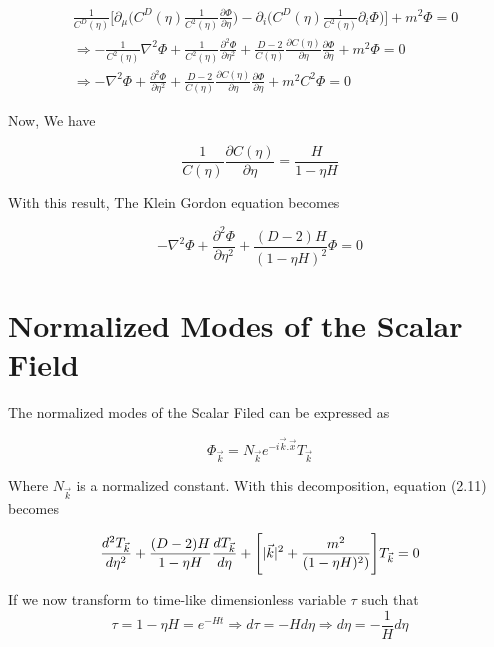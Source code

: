 \begin{equation}\label{eq8}
\begin{split}
& \frac{1}{C^D(\eta)}\bigg[\partial_\mu\bigg(C^D(\eta)\frac{1}{C^2(\eta)}\frac{\partial \Phi}{\partial \eta}\bigg) - \partial_i\bigg(C^D(\eta)\frac{1}{C^2(\eta)}\partial_i \Phi \bigg)\bigg] + m^2\Phi = 0 \\
&\Rightarrow - \frac{1}{C^2(\eta)}\nabla^2\Phi + \frac{1}{C^2(\eta)}\frac{\partial^2 \Phi}{\partial \eta^2} + \frac{D-2}{C(\eta)}\frac{\partial C(\eta)}{\partial \eta}\frac{\partial \Phi}{\partial \eta} + m^2\Phi = 0 \\
&\Rightarrow - \nabla ^2 \Phi + \frac{\partial^2\Phi}{\partial \eta^2}+\frac{D-2}{C(\eta)}\frac{\partial C(\eta)}{\partial \eta}\frac{\partial \Phi}{\partial \eta} + m^2C^2\Phi = 0
\end{split}
\end{equation}

Now, We have

\begin{equation}
\frac{1}{C(\eta)}\frac{\partial C(\eta)}{\partial \eta} = \frac{H}{1-\eta H}
\end{equation}

With this result, The Klein Gordon equation becomes

\begin{equation}
-\nabla^2\Phi + \frac{\partial^2 \Phi}{\partial\eta^2}+\frac{(D-2)H}{(1-\eta H)^2}\Phi=0
\end{equation}
\section{Normalized Modes of the Scalar Field}
The normalized modes of the Scalar Filed can be expressed as

\begin{equation}
\Phi_{\vec{k}}=N_{\vec{k}}e^{-i\vec{k}.\vec{x}}T_{\vec{k}}
\end{equation}

Where $N_{\vec{k}}$ is a normalized constant. With this decomposition, equation (2.11) becomes 

\begin{equation}
\frac{d^2T_{\vec{k}}}{d\eta^2}+\frac{(D-2)H}{1-\eta H} \frac{dT_{\vec{k}}}{d\eta} +\\
\Bigg[|\vec{k}|^2+\frac{m^2}{(1-\eta H)^2)}\Bigg]T_{\vec{k}} = 0
\end{equation}

If we now transform to time-like dimensionless variable $\tau$ such that
\begin{equation}
\tau=1-\eta H=e^{-Ht}\Rightarrow d\tau = -Hd\eta \Rightarrow d\eta = -\frac{1}{H}d\eta
\end{equation}

